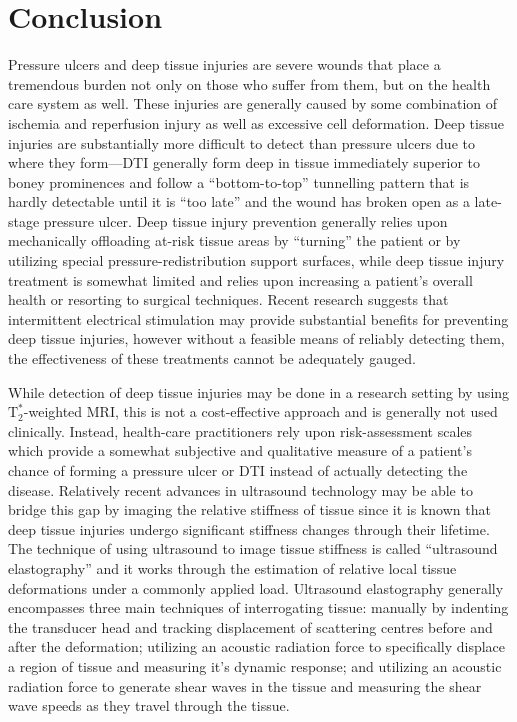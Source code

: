 	\section{Conclusion}
		Pressure ulcers and deep tissue injuries are severe wounds that place a tremendous burden not only on those who suffer from them, but on the health care system as well. These injuries are generally caused by some combination of ischemia and reperfusion injury as well as excessive cell deformation. Deep tissue injuries are substantially more difficult to detect than pressure ulcers due to where they form---DTI generally form deep in tissue immediately superior to boney prominences and follow a ``bottom-to-top'' tunnelling pattern that is hardly detectable until it is ``too late'' and the wound has broken open as a late-stage pressure ulcer. Deep tissue injury prevention generally relies upon mechanically offloading at-risk tissue areas by ``turning'' the patient or by utilizing special pressure-redistribution support surfaces, while deep tissue injury treatment is somewhat limited and relies upon increasing a patient's overall health or resorting to surgical techniques. Recent research suggests that intermittent electrical stimulation may provide substantial benefits for preventing deep tissue injuries, however without a feasible means of reliably detecting them, the effectiveness of these treatments cannot be adequately gauged.

		While detection of deep tissue injuries may be done in a research setting by using $\mathrm{T}_2^*$-weighted MRI, this is not a cost-effective approach and is generally not used clinically. Instead, health-care practitioners rely upon risk-assessment scales which provide a somewhat subjective and qualitative measure of a patient's chance of forming a pressure ulcer or DTI instead of actually detecting the disease. Relatively recent advances in ultrasound technology may be able to bridge this gap by imaging the relative stiffness of tissue since it is known that deep tissue injuries undergo significant stiffness changes through their lifetime. The technique of using ultrasound to image tissue stiffness is called ``ultrasound elastography'' and it works through the estimation of relative local tissue deformations under a commonly applied load. Ultrasound elastography generally encompasses three main techniques of interrogating tissue: manually by indenting the transducer head and tracking displacement of scattering centres before and after the deformation; utilizing an acoustic radiation force to specifically displace a region of tissue and measuring it's dynamic response; and utilizing an acoustic radiation force to generate shear waves in the tissue and measuring the shear wave speeds as they travel through the tissue.

